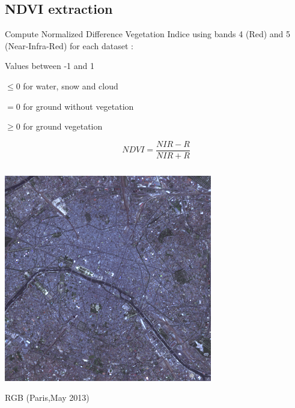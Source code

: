 \documentclass[c]{beamer}
\begin{document}
\subsection{NDVI extraction}
\begin{frame}
\begin{itemize}
{
 \item Compute Normalized Difference Vegetation Indice using bands 4 (Red) and 5 (Near-Infra-Red) for each dataset :
 \item Values between -1 and 1
 \item $\leq 0$ for water, snow and cloud
 \item $= 0$ for  ground without vegetation
 \item $\geq 0$ for ground vegetation
}
\end{itemize}
{\scriptsize \[NDVI=\frac{NIR-R}{NIR+R}\]}
\begin{columns}
 \begin{column}{0.33\textwidth}
  \begin{overlayarea}{\linewidth}{2cm}
  \centering\vfill
  \includegraphics[scale=0.15]{images/Paris/05_rgb.png}
  \end{overlayarea}
  \begin{overlayarea}{\linewidth}{0.5cm}
  \centering
  \tiny RGB (Paris,May 2013) \par
  \end{overlayarea}
 \end{column}
  \begin{column}{0.33\textwidth}
  \begin{overlayarea}{\linewidth}{2cm}
  \centering\vfill
  \centerline{
}
\end{overlayarea}
\end{column}
\end{columns}
\end{frame}
\end{document}
